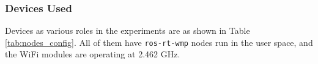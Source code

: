 \documentclass[journal]{IEEEtran}  %
\begin{document}
\subsubsection{Devices Used}
Devices as various roles in the experiments are as shown in
Table \ref{tab:nodes_config}. All of them have \texttt{ros-rt-wmp} nodes
run in the user space, and the WiFi modules are operating at 2.462 GHz.

%
%
\end{document}
